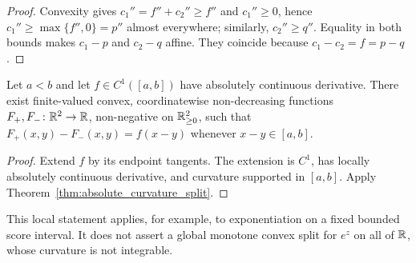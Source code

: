 \begin{proof}
Convexity gives $c_1''=f''+c_2''\ge f''$ and $c_1''\ge0$, hence $c_1''\ge\max\{f'',0\}=p''$ almost everywhere; similarly, $c_2''\ge q''$. Equality in both bounds makes $c_1-p$ and $c_2-q$ affine. They coincide because $c_1-c_2=f=p-q$.
\end{proof}

\begin{corollary}\label{cor:local_curvature_split}
Let $a<b$ and let $f\in C^1([a,b])$ have absolutely continuous derivative. There exist finite-valued convex, coordinatewise non-decreasing functions $F_+,F_-\colon\mathbb{R}^2\to\mathbb{R}$, non-negative on $\mathbb{R}^2_{\ge0}$, such that $F_+(x,y)-F_-(x,y)=f(x-y)$ whenever $x-y\in[a,b]$.
\end{corollary}

\begin{proof}
Extend $f$ by its endpoint tangents. The extension is $C^1$, has locally absolutely continuous derivative, and curvature supported in $[a,b]$. Apply Theorem~\ref{thm:absolute_curvature_split}.
\end{proof}

This local statement applies, for example, to exponentiation on a fixed bounded score interval. It does not assert a global monotone convex split for $e^z$ on all of $\mathbb{R}$, whose curvature is not integrable.


